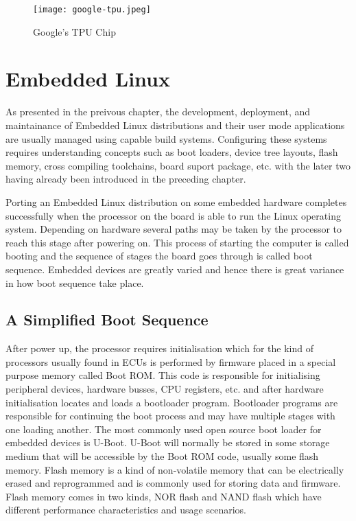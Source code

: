 \begin{figure}[h]
	\centering
	\texttt{[image: google-tpu.jpeg]}
	\caption{Google's TPU Chip}
\end{figure}

\section{Embedded Linux}

As presented in the preivous chapter, the development, deployment, and maintainance of Embedded Linux distributions and their user mode applications are usually managed using capable build systems. Configuring these systems requires understanding concepts such as boot loaders, device tree layouts, flash memory, cross compiling toolchains, board suport package, etc. with the later two having already been introduced in the preceding chapter.

Porting an Embedded Linux distribution on some embedded hardware completes successfully when the processor on the board is able to run the Linux operating system. Depending on hardware several paths may be taken by the processor to reach this stage after powering on. This process of starting the computer is called booting and the sequence of stages the board goes through is called boot sequence. Embedded devices are greatly varied and hence there is great variance in how boot sequence take place.

\subsection{A Simplified Boot Sequence}

After power up, the processor requires initialisation which for the kind of processors usually found in ECUs is performed by firmware placed in a special purpose memory called Boot ROM. This code is responsible for initialising peripheral devices, hardware busses, CPU registers, etc. and after hardware initialisation locates and loads a bootloader program. Bootloader programs are responsible for continuing the boot process and may have multiple stages with one loading another. The most commonly used open source boot loader for embedded devices is U-Boot. U-Boot will normally be stored in some storage medium that will be accessible by the Boot ROM code, usually some flash memory. Flash memory is a kind of non-volatile memory that can be electrically erased and reprogrammed and is commonly used for storing data and firmware. Flash memory comes in two kinds, NOR flash and NAND flash which have different performance characteristics and usage scenarios.

